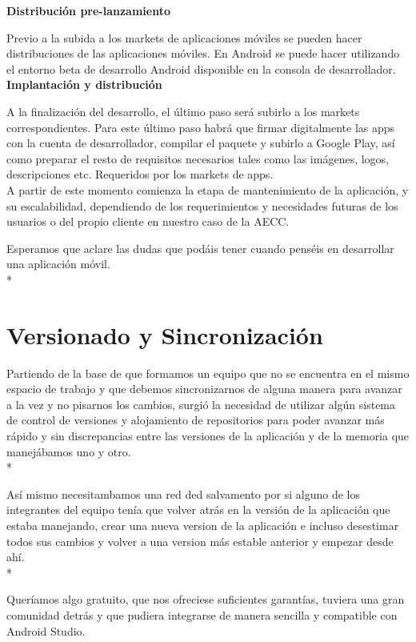 \documentclass[../pfc.tex]{subfiles}
\begin{document}
	\textbf{Distribución pre-lanzamiento}
	
	Previo a la subida a los markets de aplicaciones móviles se pueden hacer distribuciones de las aplicaciones móviles. En Android se puede hacer utilizando el entorno beta de desarrollo  Android disponible en la consola de desarrollador.\\
	
	\textbf{Implantación y distribución}
	
	A la finalización del desarrollo, el último paso será subirlo a los markets correspondientes. Para este último paso habrá que firmar digitalmente las apps con la cuenta de desarrollador, compilar el paquete y subirlo a Google Play, así como preparar el resto de requisitos necesarios tales como las imágenes, logos, descripciones etc. Requeridos por los markets de apps.\\
	A partir de este momento comienza la etapa de mantenimiento de la aplicación, y su escalabilidad, dependiendo de los requerimientos y necesidades futuras de los usuarios o del propio cliente en  nuestro caso de la AECC.
	
	Esperamos que aclare las dudas que podáis tener cuando penséis en desarrollar una aplicación móvil.\\*
	
	\section{Versionado y Sincronización}
	Partiendo de la base de que formamos un equipo que no se encuentra en el mismo espacio de trabajo y que debemos sincronizarnos de alguna manera para avanzar a la vez y no pisarnos los cambios, surgió la necesidad de utilizar algún sistema de control de versiones y alojamiento de repositorios para poder avanzar más rápido y sin discrepancias entre las versiones de la aplicación y de la memoria que manejábamos uno y otro.\\*
	
	Así mismo necesitambamos una red ded salvamento por si alguno de los integrantes del equipo tenía que volver atrás en la versión de la aplicación que estaba manejando, crear una nueva version de la aplicación e incluso desestimar todos sus cambios y volver a una version más estable anterior y empezar desde ahí.\\*
		
	Queríamos algo gratuito, que nos ofreciese suficientes garantías, tuviera una gran comunidad detrás y que pudiera integrarse de manera sencilla y compatible con Android Studio. 
	
\end{document}
